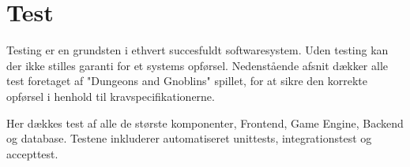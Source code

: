 \section{Test}
Testing er en grundsten i ethvert succesfuldt softwaresystem. Uden testing kan
der ikke stilles garanti for et systems opførsel. Nedenstående afsnit dækker
alle test foretaget af "Dungeons and Gnoblins" spillet, for at sikre den korrekte
opførsel i henhold til kravspecifikationerne.

Her dækkes test af alle de største komponenter, Frontend, Game Engine, Backend og
database. Testene inkluderer automatiseret unittests, integrationstest og accepttest.

